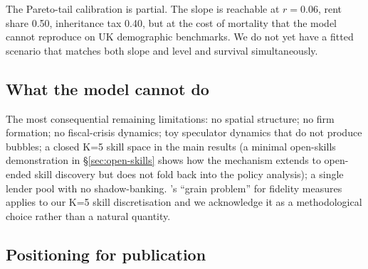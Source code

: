 \documentclass[11pt]{article}
\begin{document}
The Pareto-tail calibration is partial. The slope is reachable at
$r=0.06$, rent share 0.50, inheritance tax 0.40, but at the cost of
mortality that the model cannot reproduce on UK demographic
benchmarks. We do not yet have a fitted scenario that matches both
slope and level and survival simultaneously.

\subsection{What the model cannot do}

The most consequential remaining limitations: no spatial structure;
no firm formation; no fiscal-crisis dynamics; toy speculator
dynamics that do not produce bubbles; a closed K=5 skill space in
the main results (a minimal open-skills demonstration in
\S\ref{sec:open-skills} shows how the mechanism extends to
open-ended skill discovery but does not fold back into the policy
analysis); a single lender pool with no shadow-banking.
\citet{charbonneau2021fidelity}'s ``grain problem'' for fidelity
measures applies to our K=5 skill discretisation and we acknowledge
it as a methodological choice rather than a natural quantity.

\subsection{Positioning for publication}
\end{document}
